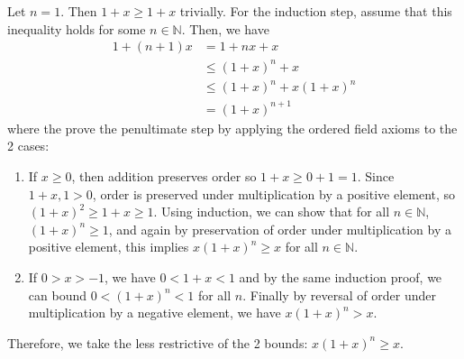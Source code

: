 \documentclass{article}
\begin{document}
    \begin{exercise}
      Let $n = 1$. Then $1 + x \geq 1 + x$ trivially. For the induction step, assume that this inequality holds for some $n \in \mathbb{N}$. Then, we have 
      \begin{align}
        1 + (n+1) x & = 1 + nx + x \\
                    & \leq (1+x)^n + x \\ 
                    & \leq (1+x)^n + x(1+x)^n \\
                    & = (1+x)^{n+1}
      \end{align} 
      where the prove the penultimate step by applying the ordered field axioms to the 2 cases: 
      \begin{enumerate}
        \item If $x \geq 0$, then addition preserves order so $1 + x \geq 0 + 1 = 1$. Since $1 + x, 1 > 0$, order is preserved under multiplication by a positive element, so $(1+x)^2 \geq 1+x \geq 1$. Using induction, we can show that for all $n \in \mathbb{N}$, $(1+x)^n \geq 1$, and again by preservation of order under multiplication by a positive element, this implies $x (1 + x)^n \geq x$ for all $n \in \mathbb{N}$. 
        \item If $0 > x > -1$, we have $0 < 1 + x < 1$ and by the same induction proof, we can bound $0 < (1+x)^n < 1$ for all $n$. Finally by reversal of order under multiplication by a negative element, we have $x (1+x)^n > x$. 
      \end{enumerate}
      Therefore, we take the less restrictive of the 2 bounds: $x(1+x)^n \geq x$. 
    \end{exercise}
\end{document}
